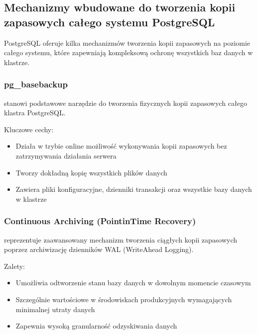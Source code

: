 \documentclass[a4paper,11pt,openany,english]{sphinxmanual}
\begin{document}
\subsection{Mechanizmy wbudowane do tworzenia kopii zapasowych całego systemu PostgreSQL}
\label{\detokenize{rozdzial2/Kopie_zapasowe_i_odzyskiwanie_danych/kopie_zapasowe_i_odzyskiwanie_danych:mechanizmy-wbudowane-do-tworzenia-kopii-zapasowych-calego-systemu-postgresql}}
\sphinxAtStartPar
PostgreSQL oferuje kilka mechanizmów tworzenia kopii zapasowych na poziomie całego systemu, które zapewniają kompleksową ochronę wszystkich baz danych w klastrze.


\subsubsection{pg\_basebackup}
\label{\detokenize{rozdzial2/Kopie_zapasowe_i_odzyskiwanie_danych/kopie_zapasowe_i_odzyskiwanie_danych:pg-basebackup}}
\sphinxAtStartPar
{} stanowi podstawowe narzędzie do tworzenia fizycznych kopii zapasowych całego klastra PostgreSQL.

\sphinxAtStartPar
Kluczowe cechy:
\begin{itemize}
\item {} 
\sphinxAtStartPar
Działa w trybie online \sphinxhyphen{} możliwość wykonywania kopii zapasowych bez zatrzymywania działania serwera

\item {} 
\sphinxAtStartPar
Tworzy dokładną kopię wszystkich plików danych

\item {} 
\sphinxAtStartPar
Zawiera pliki konfiguracyjne, dzienniki transakcji oraz wszystkie bazy danych w klastrze

\end{itemize}


\subsubsection{Continuous Archiving (Point\sphinxhyphen{}in\sphinxhyphen{}Time Recovery)}
\label{\detokenize{rozdzial2/Kopie_zapasowe_i_odzyskiwanie_danych/kopie_zapasowe_i_odzyskiwanie_danych:continuous-archiving-point-in-time-recovery}}
\sphinxAtStartPar
{} reprezentuje zaawansowany mechanizm tworzenia ciągłych kopii zapasowych poprzez archiwizację dzienników WAL (Write\sphinxhyphen{}Ahead Logging).

\sphinxAtStartPar
Zalety:
\begin{itemize}
\item {} 
\sphinxAtStartPar
Umożliwia odtworzenie stanu bazy danych w dowolnym momencie czasowym

\item {} 
\sphinxAtStartPar
Szczególnie wartościowe w środowiskach produkcyjnych wymagających minimalnej utraty danych

\item {} 
\sphinxAtStartPar
Zapewnia wysoką granularność odzyskiwania danych

\end{itemize}
\end{document}

